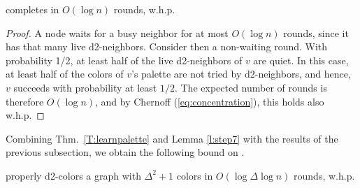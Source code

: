 \begin{lemma}
 completes in $O(\log n)$ rounds, w.h.p.
\label{l:step7}
\end{lemma}

\begin{proof}
A node waits for a busy neighbor for at most $O(\log n)$ rounds, since it has that many live d2-neighbors.
Consider then a non-waiting round.
With probability 1/2, at least half of the live d2-neighbors of $v$ are quiet. In this case, at least half of the colors of $v$'s palette are not tried by d2-neighbors, and hence, $v$ succeeds with probability at least $1/2$. The expected number of rounds is therefore $O(\log n)$, and by Chernoff (\ref{eq:concentration}), this holds also w.h.p.
\end{proof}

Combining Thm.~\ref{T:learnpalette} and Lemma \ref{l:step7} with the results of the previous subsection, we obtain the following bound on .

\begin{theorem}
\label{thm:d2ColoringRand}
 properly d2-colors a graph with $\Delta^2+1$ colors in $O(\log \Delta \log n)$ rounds, w.h.p.
\end{theorem}
